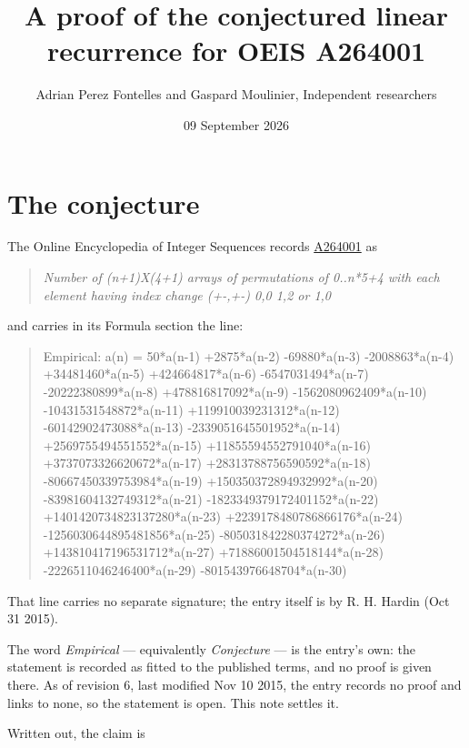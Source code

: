 \documentclass[11pt]{article}
\title{A proof of the conjectured linear recurrence for OEIS A264001}
\author{Adrian Perez Fontelles and Gaspard Moulinier, Independent researchers}
\date{09 September 2026}
\theoremstyle{definition}
\begin{document}
\maketitle
\section{The conjecture}

The Online Encyclopedia of Integer Sequences records \href{https://oeis.org/A264001}{A264001} as

\begin{quote}\itshape Number of (n+1)X(4+1) arrays of permutations of 0..n*5+4 with each element having index change (+-,+-) 0,0 1,2 or 1,0\end{quote}

and carries in its Formula section the line:

\begin{quote}\ttfamily Empirical: a(n) = 50*a(n-1) +2875*a(n-2) -69880*a(n-3) -2008863*a(n-4) +34481460*a(n-5) +424664817*a(n-6) -6547031494*a(n-7) -20222380899*a(n-8) +478816817092*a(n-9) -1562080962409*a(n-10) -10431531548872*a(n-11) +119910039231312*a(n-12) -60142902473088*a(n-13) -2339051645501952*a(n-14) +2569755494551552*a(n-15) +11855594552791040*a(n-16) +3737073326620672*a(n-17) +28313788756590592*a(n-18) -80667450339753984*a(n-19) +150350372894932992*a(n-20) -83981604132749312*a(n-21) -1823349379172401152*a(n-22) +1401420734823137280*a(n-23) +2239178480786866176*a(n-24) -1256030644895481856*a(n-25) -805031842280374272*a(n-26) +143810417196531712*a(n-27) +71886001504518144*a(n-28) -2226511046246400*a(n-29) -801543976648704*a(n-30)\end{quote}

That line carries no separate signature; the entry itself is by R. H. Hardin (Oct 31 2015).

The word {\itshape Empirical} --- equivalently {\itshape Conjecture} --- is the entry's own: the statement is recorded as fitted to the published terms, and no proof is given there. As of revision 6, last modified Nov 10 2015, the entry records no proof and links to none, so the statement is open. This note settles it.

Written out, the claim is
\end{document}
